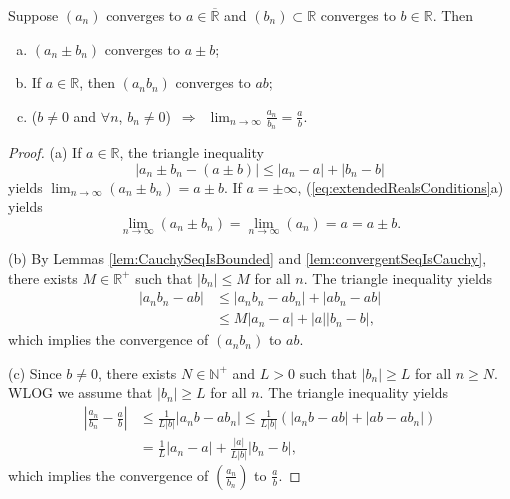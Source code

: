 \begin{thm}
  \label{thm:limitOperation}
  Suppose $(a_{n})$ converges to $a\in \overline{\mathbb{R}}$
  and $(b_{n})\subset \mathbb{R}$ converges to $b\in \mathbb{R}$.
  Then
  \begin{enumerate}[(a)]\itemsep0em
  \item $(a_{n}\pm b_{n})$ converges to $a\pm b$;
  \item If $a\in \mathbb{R}$, then $(a_{n}b_{n})$ converges to $ab$;
  \item ($b\ne 0$ and $\forall n$, $b_{n}\ne 0$)\ $\Rightarrow$\ 
    $\lim_{n\rightarrow \infty}\frac{a_{n}}{b_{n}} = \frac{a}{b}$.
  \end{enumerate}
\end{thm}
\begin{proof}
  (a) If $a\in \mathbb{R}$, the triangle inequality
  \begin{displaymath}
    |a_{n}\pm b_{n}-(a\pm b)|\le |a_{n}-a|+|b_{n}-b|
  \end{displaymath}
  yields $\lim_{n\rightarrow \infty}(a_{n}\pm b_{n})=a\pm b$.
  If $a=\pm\infty$, (\ref{eq:extendedRealsConditions}a) yields 
  \begin{displaymath}
    \lim_{n\rightarrow\infty}(a_{n}\pm b_{n})
    =\lim_{n\rightarrow\infty}(a_{n})=a=a\pm b.
  \end{displaymath}

  (b) By Lemmas \ref{lem:CauchySeqIsBounded}
  and \ref{lem:convergentSeqIsCauchy}, 
  there exists $M\in\mathbb{R}^+$ such that $|b_{n}|\le M$ for all $n$.
  The triangle inequality yields
  \begin{align*}
    |a_{n}b_{n}-ab|
    &\le |a_{n}b_{n}-ab_{n}|+|ab_{n}-ab|\\
    &\le M|a_{n}-a|+|a||b_{n}-b|,
  \end{align*}
  which implies the convergence of $(a_{n}b_{n})$ to $ab$.

  (c) Since $b\ne 0$, there exists $N\in \mathbb{N}^{+}$ and $L>0$
  such that $|b_{n}|\ge L$ for all $n\ge N$. WLOG we assume that
  $|b_{n}|\ge L$ for all $n$. The triangle inequality yields
  \begin{align*}
    \left| \frac{a_{n}}{b_{n}}-\frac{a}{b} \right|
    &\le \frac{1}{L|b|}|a_{n}b-ab_{n}| 
    \le \frac{1}{L|b|}(|a_{n}b-ab|+|ab-ab_{n}|) \\
    &=\frac{1}{L}|a_{n}-a|+\frac{|a|}{L|b|}|b_{n}-b|,
  \end{align*}
  which implies the convergence of $(\frac{a_{n}}{b_{n}})$
  to $\frac{a}{b}$.
\end{proof}

